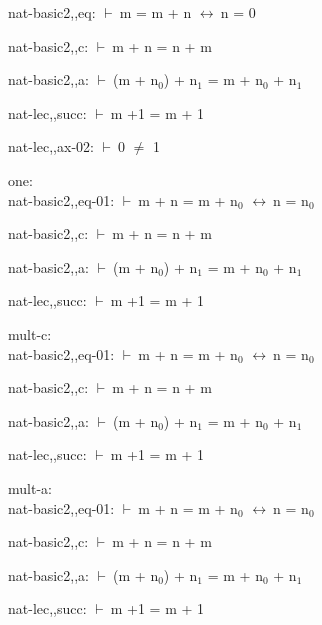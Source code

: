 \documentclass[a4paper]{article}
\newcommand{\Fol}{\mbox{$\vdash\ $}}
\newcommand{\Equiv}{\mbox{$\leftrightarrow\ $}}
\begin{document}
nat-basic2,,eq: 
 \Fol m = m + n \Equiv n = 0



nat-basic2,,c: 
 \Fol m + n = n + m



nat-basic2,,a: 
 \Fol (m + $\mbox{n}_{0}$) + $\mbox{n}_{1}$ = m + $\mbox{n}_{0}$ + $\mbox{n}_{1}$



nat-lec,,succ: 
 \Fol m +1 = m + 1



nat-lec,,ax-02: 
 \Fol 0 $\neq$ 1



\bigskip

one:\\ nat-basic2,,eq-01: 
 \Fol m + n = m + $\mbox{n}_{0}$ \Equiv n = $\mbox{n}_{0}$



nat-basic2,,c: 
 \Fol m + n = n + m



nat-basic2,,a: 
 \Fol (m + $\mbox{n}_{0}$) + $\mbox{n}_{1}$ = m + $\mbox{n}_{0}$ + $\mbox{n}_{1}$



nat-lec,,succ: 
 \Fol m +1 = m + 1



\bigskip

mult-c:\\ nat-basic2,,eq-01: 
 \Fol m + n = m + $\mbox{n}_{0}$ \Equiv n = $\mbox{n}_{0}$



nat-basic2,,c: 
 \Fol m + n = n + m



nat-basic2,,a: 
 \Fol (m + $\mbox{n}_{0}$) + $\mbox{n}_{1}$ = m + $\mbox{n}_{0}$ + $\mbox{n}_{1}$



nat-lec,,succ: 
 \Fol m +1 = m + 1



\bigskip

mult-a:\\ nat-basic2,,eq-01: 
 \Fol m + n = m + $\mbox{n}_{0}$ \Equiv n = $\mbox{n}_{0}$



nat-basic2,,c: 
 \Fol m + n = n + m



nat-basic2,,a: 
 \Fol (m + $\mbox{n}_{0}$) + $\mbox{n}_{1}$ = m + $\mbox{n}_{0}$ + $\mbox{n}_{1}$



nat-lec,,succ: 
 \Fol m +1 = m + 1
\end{document}
